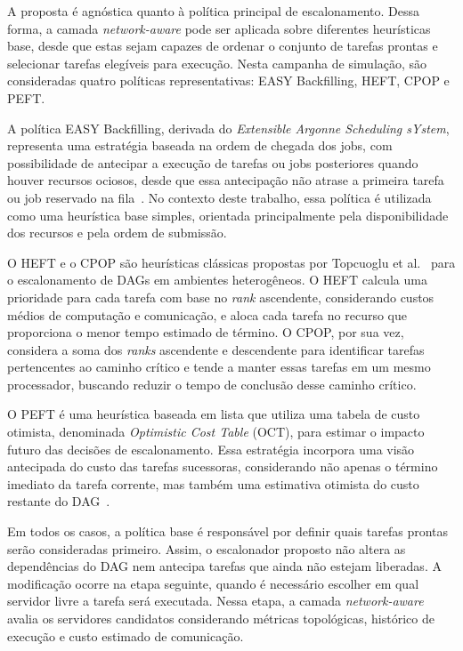 \documentclass[12pt]{article}
\begin{document}
A proposta é agnóstica quanto à política principal de escalonamento. 
%
Dessa forma, a camada \textit{network-aware} pode ser aplicada sobre diferentes heurísticas base, desde que estas sejam capazes de ordenar o conjunto de tarefas prontas e selecionar tarefas elegíveis para execução. 
%
Nesta campanha de simulação, são consideradas quatro políticas representativas: EASY Backfilling, HEFT, CPOP e PEFT.

A política EASY Backfilling, derivada do \textit{Extensible Argonne Scheduling sYstem}, representa uma estratégia baseada na ordem de chegada dos jobs, com possibilidade de antecipar a execução de tarefas ou jobs posteriores quando houver recursos ociosos, desde que essa antecipação não atrase a primeira tarefa ou job reservado na fila~\cite{lifka1995anl}. 
%
No contexto deste trabalho, essa política é utilizada como uma heurística base simples, orientada principalmente pela disponibilidade dos recursos e pela ordem de submissão.

O HEFT e o CPOP são heurísticas clássicas propostas por Topcuoglu et al.~\cite{topcuoglu2002performance} para o escalonamento de DAGs em ambientes heterogêneos. 
%
O HEFT calcula uma prioridade para cada tarefa com base no \textit{rank} ascendente, considerando custos médios de computação e comunicação, e aloca cada tarefa no recurso que proporciona o menor tempo estimado de término. 
%
O CPOP, por sua vez, considera a soma dos \textit{ranks} ascendente e descendente para identificar tarefas pertencentes ao caminho crítico e tende a manter essas tarefas em um mesmo processador, buscando reduzir o tempo de conclusão desse caminho crítico.

O PEFT é uma heurística baseada em lista que utiliza uma tabela de custo otimista, denominada \textit{Optimistic Cost Table} (OCT), para estimar o impacto futuro das decisões de escalonamento. 
%
Essa estratégia incorpora uma visão antecipada do custo das tarefas sucessoras, considerando não apenas o término imediato da tarefa corrente, mas também uma estimativa otimista do custo restante do DAG~\cite{arabnejad2014peft}.

Em todos os casos, a política base é responsável por definir quais tarefas prontas serão consideradas primeiro. 
%
Assim, o escalonador proposto não altera as dependências do DAG nem antecipa tarefas que ainda não estejam liberadas. 
%
A modificação ocorre na etapa seguinte, quando é necessário escolher em qual servidor livre a tarefa será executada. 
%
Nessa etapa, a camada \textit{network-aware} avalia os servidores candidatos considerando métricas topológicas, histórico de execução e custo estimado de comunicação.
\end{document}
